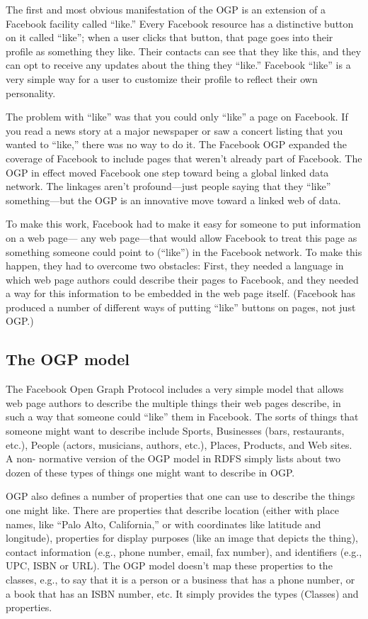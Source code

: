 The first and most obvious manifestation of the OGP is an extension of a
Facebook facility called ``like.'' Every Facebook resource has a
distinctive button on it called ``like''; when a user clicks that
button, that page goes into their profile as something they like. Their
contacts can see that they like this, and they can opt to receive any
updates about the thing they ``like.'' Facebook ``like'' is a very
simple way for a user to customize their profile to reflect their own
personality.

The problem with ``like'' was that you could only ``like'' a page on
Facebook. If you read a news story at a major newspaper or saw a concert
listing that you wanted to ``like,'' there was no way to do it. The
Facebook OGP expanded the coverage of Facebook to include pages that
weren't already part of Facebook. The OGP in effect moved Facebook one
step toward being a global linked data network. The linkages aren't
profound---just people saying that they ``like'' something---but the OGP
is an innovative move toward a linked web of data.

To make this work, Facebook had to make it easy for someone to put
information on a web page--- any web page---that would allow Facebook to
treat this page as something someone could point to (``like'') in the
Facebook network. To make this happen, they had to overcome two
obstacles: First, they needed a language in which web page authors could
describe their pages to Facebook, and they needed a way for this
information to be embedded in the web page itself. (Facebook has
produced a number of different ways of putting ``like'' buttons on
pages, not just OGP.)

\subsection{The OGP model}

The Facebook Open Graph Protocol includes a very simple model that
allows web page authors to describe the multiple things their web pages
describe, in such a way that someone could ``like'' them in Facebook.
The sorts of things that someone might want to describe include Sports,
Businesses (bars, restaurants, etc.), People (actors, musicians,
authors, etc.), Places, Products, and Web sites. A non- normative
version of the OGP model in RDFS simply lists about two dozen of these
types of things one might want to describe in OGP.

OGP also defines a number of properties that one can use to describe the
things one might like. There are properties that describe location
(either with place names, like ``Palo Alto, California,'' or with
coordinates like latitude and longitude), properties for display
purposes (like an image that depicts the thing), contact information
(e.g., phone number, email, fax number), and identifiers (e.g., UPC,
ISBN or URL). The OGP model doesn't map these properties to the classes,
e.g., to say that it is a person or a business that has a phone number,
or a book that has an ISBN number, etc. It simply provides the types
(Classes) and properties.

